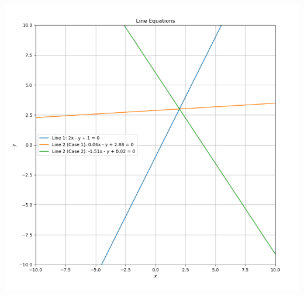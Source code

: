 \documentclass[12pt]{article}
\begin{document}
\begin{enumerate}
 \begin{center}
 \includegraphics[width=\columnwidth]{line21.png}  
 \end{center}\vspace{1mm}
\end{enumerate}
\end{document}
